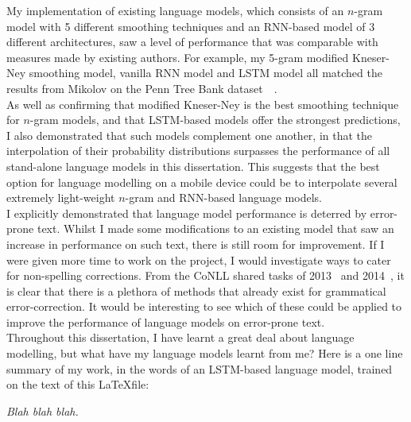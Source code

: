 \documentclass[a4paper, 12pt]{report}
\newcommand{\tit}[1]{\textit{#1}}
\begin{document}
My implementation of existing language models, which consists of an $n$-gram model with 5 different smoothing techniques and an RNN-based model of 3 different architectures, saw a level of performance that was comparable with measures made by existing authors. For example, my 5-gram modified Kneser-Ney smoothing model, vanilla RNN model and LSTM model all matched the results from Mikolov on the Penn Tree Bank dataset~\cite{rnn_ptb:mikolov2012}~\cite{lstm_ptb:mikolov2014}. \\

As well as confirming that modified Kneser-Ney is the best smoothing technique for $n$-gram models, and that LSTM-based models offer the strongest predictions, I also demonstrated that such models complement one another, in that the interpolation of their probability distributions surpasses the performance of all stand-alone language models in this dissertation. This suggests that the best option for language modelling on a mobile device could be to interpolate several extremely light-weight $n$-gram and RNN-based language models. \\

I explicitly demonstrated that language model performance is deterred by error-prone text. Whilst I made some modifications to an existing model that saw an increase in performance on such text, there is still room for improvement. If I were given more time to work on the project, I would investigate ways to cater for non-spelling corrections. From the CoNLL shared tasks of 2013~\cite{error_correction2013:ng2013} and 2014~\cite{error_correction2014:ng2014}, it is clear that there is a plethora of methods that already exist for grammatical error-correction. It would be interesting to see which of these could be applied to improve the performance of language models on error-prone text. \\

Throughout this dissertation, I have learnt a great deal about language modelling, but what have my language models learnt from me? Here is a one line summary of my work, in the words of an LSTM-based language model, trained on the text of this \LaTeX file: \\

\begin{center}
	\tit{Blah blah blah.}
\end{center}

\end{document}
